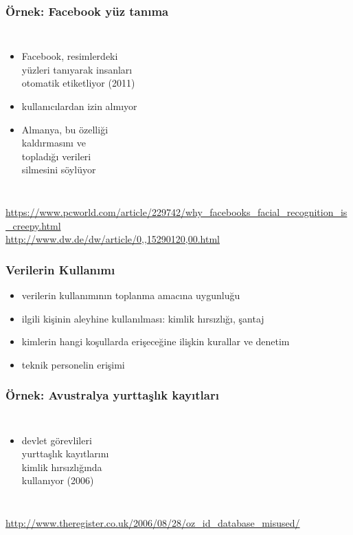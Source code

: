 \documentclass[dvipsnames]{beamer}
\theoremstyle{definition}
\theoremstyle{example}
\theoremstyle{plain}
\begin{document}
\begin{frame}
  \frametitle{Örnek: Facebook yüz tanıma}

  \begin{columns}

    \begin{itemize}
      \item Facebook, resimlerdeki\\
        yüzleri tanıyarak insanları\\
        otomatik etiketliyor (2011)
      \item kullanıcılardan izin almıyor
      \item Almanya, bu özelliği\\
        kaldırmasını ve\\
        topladığı verileri\\
        silmesini söylüyor
    \end{itemize}
  \end{columns}

  \medskip
  \tiny{\url{https://www.pcworld.com/article/229742/why_facebooks_facial_recognition_is_creepy.html}}\\
  \tiny{\url{http://www.dw.de/dw/article/0,,15290120,00.html}}\\
\end{frame}

\begin{frame}
  \frametitle{Verilerin Kullanımı}

  \begin{itemize}
    \item verilerin kullanımının toplanma amacına uygunluğu
    \item ilgili kişinin aleyhine kullanılması: kimlik hırsızlığı, şantaj

    \medskip
    \item kimlerin hangi koşullarda erişeceğine ilişkin kurallar ve denetim
    \item teknik personelin erişimi
  \end{itemize}
\end{frame}

\begin{frame}
  \frametitle{Örnek: Avustralya yurttaşlık kayıtları}

  \begin{columns}

    \begin{itemize}
      \item devlet görevlileri\\
        yurttaşlık kayıtlarını\\
        kimlik hırsızlığında\\
        kullanıyor (2006)
    \end{itemize}
  \end{columns}

  \medskip
  \tiny{\url{http://www.theregister.co.uk/2006/08/28/oz_id_database_misused/}}\\
\end{frame}
\end{document}
